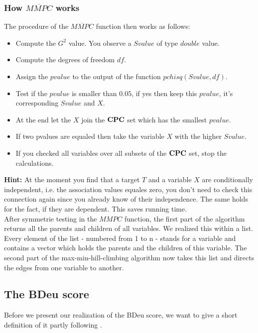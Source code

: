 			\subsubsection{How $\overline{MMPC}$ works}

				 The procedure of the $\overline{MMPC}$ function then works as follows:

				\begin{itemize}
					\item Compute the $G^{2}$ value. You observe a $Svalue$ of type $double$ value.
					\item Compute the degrees of freedom $df$.
					\item Assign the $pvalue$ to the output of the function $pchisq(Svalue, df)$.
					\item Test if the $pvalue$ is smaller than $0.05$, if yes then keep this $pvalue$, it's corresponding $Svalue$ and $X$.
					\item At the end let the $X$ join the ${\textbf{CPC}}$ set which has the smallest $pvalue$.
					\item If two pvalues are equaled then take the variable $X$ with the higher $Svalue$.
					\item If you checked all variables over all subsets of the ${\textbf{CPC}}$ set, stop the calculations.
				\end{itemize}

				\textbf{Hint:} At the moment you find that a target $T$ and a variable $X$ are conditionally independent, i.e. the association values equales zero, you don't need to check this connection again since you already know of their independence. The same holds for the fact, if they are dependent. This saves running time.\\
				After symmetrie testing in the $MMPC$ function, the first part of the algorithm returns all the parents and children of all variables. We realized this within a list. Every element of the list - numbered from 1 to n - stands for a variable and contains a vector which holds the parents and the children of this variable. The second part of the max-min-hill-climbing algorithm now takes this list and directs the edges from one variable to another.

		\subsection{The BDeu score}

			Before we present our realization of the BDeu score, we want to give a short definition of it partly following \cite{Ca06}.

